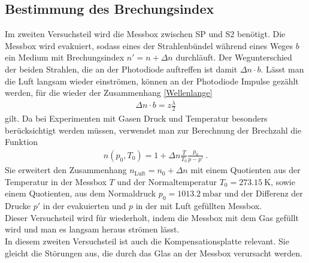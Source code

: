 \subsection*{Bestimmung des Brechungsindex}
Im zweiten Versuchsteil wird die Messbox zwischen SP und S2 benötigt. Die Messbox wird evakuiert, sodass eines der Strahlenbündel während eines Weges $b$ ein Medium mit Brechungsindex $n' = n + \Delta n$ durchläuft. Der Wegunterschied der beiden Strahlen, die an der Photodiode auftreffen ist damit $\Delta n\cdot b$. Lässt man die Luft langsam wieder einströmen, können an der Photodiode Impulse gezählt werden, für die wieder der Zusammenhang \eqref{Wellenlange}
\begin{align}\label{brechungsindex1}
	\Delta n\cdot b = z \frac{\lambda}{2}
\end{align}
gilt. Da bei Experimenten mit Gasen Druck und Temperatur besonders berücksichtigt werden müssen, verwendet man zur Berechnung der Brechzahl die Funktion
\begin{align}\label{brechungsindex}
	n(p_0,T_0) = 1 + \Delta n\frac{T}{T_0}\frac{p_0}{p-p'} \ .
\end{align}
Sie erweitert den Zusammenhang $n_\text{Luft} = n_0+\Delta n$ mit einem Quotienten aus der Temperatur in der Messbox $T$ und der Normaltemperatur $T_0=\SI{273.15}{\kelvin}$, sowie einem Quotienten, aus dem Normaldruck $p_0=\SI{1013.2}{\milli\bar}$ und der Differenz der Drucke $p'$ in der evakuierten und $p$ in der mit Luft gefüllten Messbox. \\
Dieser Versuchsteil wird für  wiederholt, indem die Messbox mit dem Gas gefüllt wird und man es langsam heraus strömen lässt. \\
In diesem zweiten Versuchsteil ist auch die Kompensationsplatte relevant. Sie gleicht die Störungen aus, die durch das Glas an der Messbox verursacht werden.